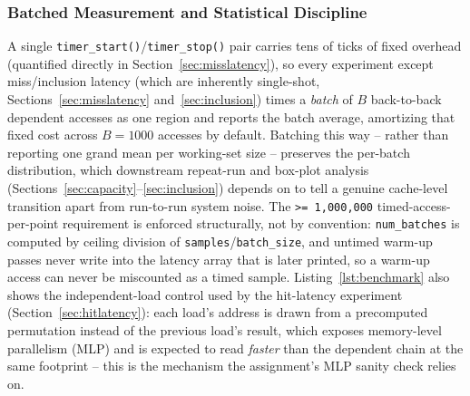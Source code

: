 \documentclass{article}
\begin{document}
\subsubsection{Batched Measurement and Statistical Discipline}
\label{sec:batching}

A single \texttt{timer\_start()}/\texttt{timer\_stop()} pair carries tens of ticks of fixed
overhead (quantified directly in Section~\ref{sec:misslatency}), so every experiment except
miss/inclusion latency (which are inherently single-shot, Sections~\ref{sec:misslatency}
and~\ref{sec:inclusion}) times a \emph{batch} of $B$ back-to-back dependent accesses as one
region and reports the batch average, amortizing that fixed cost across $B{=}1000$
accesses by default. Batching this way -- rather than reporting one grand mean per
working-set size -- preserves the per-batch distribution, which downstream repeat-run and
box-plot analysis (Sections~\ref{sec:capacity}--\ref{sec:inclusion}) depends on to tell a
genuine cache-level transition apart from run-to-run system noise. The
\texttt{>= 1{,}000{,}000} timed-access-per-point requirement is enforced structurally, not
by convention: \texttt{num\_batches} is computed by ceiling division of
\texttt{samples}/\texttt{batch\_size}, and untimed warm-up passes never write into the
latency array that is later printed, so a warm-up access can never be miscounted as a timed
sample. Listing~\ref{lst:benchmark} also shows the independent-load control used
by the hit-latency experiment (Section~\ref{sec:hitlatency}): each load's address is drawn
from a precomputed permutation instead of the previous load's result, which exposes
memory-level parallelism (MLP) and is expected to read \emph{faster} than the dependent
chain at the same footprint -- this is the mechanism the assignment's MLP sanity check
relies on.
\end{document}
